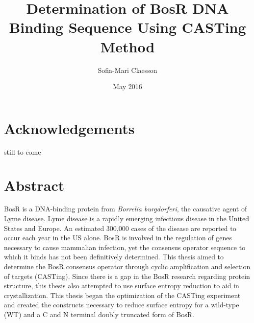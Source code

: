 \documentclass[12pt,twoside]{reedthesis}
\title{Determination of BosR DNA Binding Sequence Using CASTing Method}
\author{Sofia-Mari Claesson}
\date{May 2016}
\begin{document}
  \maketitle
  \frontmatter %
  \pagestyle{empty} %
  
  \newcommand{\sofiachapter}[1]{
  	\chapter*{#1}
  	\addcontentsline{toc}{chapter}{#1}
  	\chaptermark{#1}
  	\markboth{#1}{#1}
  }
  
    \setcounter{secnumdepth}{0}

    \chapter*{Acknowledgements}
    
    still to come


    \tableofcontents
    \listoftables
    \listoffigures

    \chapter*{Abstract}
    
    \doublespacing
    
    BosR is a DNA-binding protein from \textit{Borrelia burgdorferi}, the causative agent of Lyme disease. Lyme disease is a rapidly emerging infectious disease in the United States and Europe. An estimated 300,000 cases of the disease are reported to occur each year in the US alone. BosR is involved in the regulation of genes necessary to cause mammalian infection, yet the consensus operator sequence to which it binds has not been definitively determined. This thesis aimed to determine the BosR consensus operator through cyclic amplification and selection of targets (CASTing). Since there is a gap in the BosR research regarding protein structure, this thesis also attempted to use surface entropy reduction to aid in crystallization. This thesis began the optimization of the CASTing experiment and created the constructs necessary to reduce surface entropy for a wild-type (WT) and a C and N terminal doubly truncated form of BosR.
	
\end{document}
